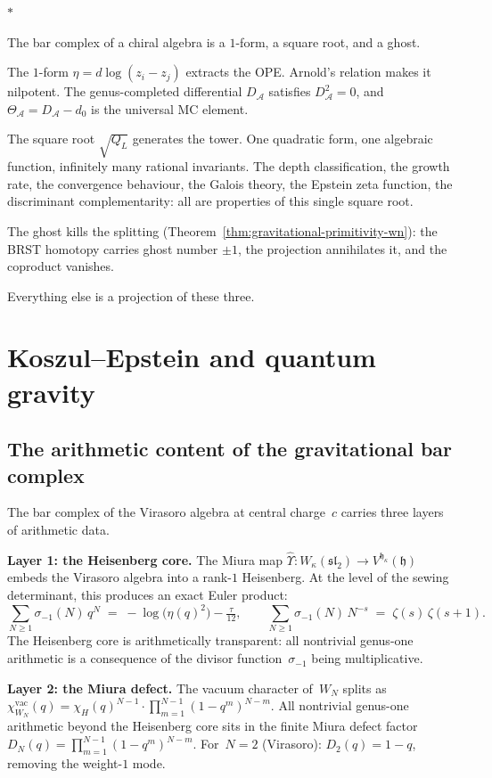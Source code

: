 \documentclass[11pt]{article}
\newcommand{\cA}{\mathcal{A}}
\newcommand{\sep}{\bigskip\begin{center}$*$\end{center}\medskip}
\begin{document}
\sep

The bar complex of a chiral algebra is a $1$-form, a square
root, and a ghost.

The $1$-form $\eta = d\log(z_i - z_j)$ extracts the OPE.
Arnold's relation makes it nilpotent.  The genus-completed
differential $D_\cA$ satisfies $D_\cA^2 = 0$, and
$\Theta_\cA = D_\cA - d_0$ is the universal MC element.

The square root $\sqrt{Q_L}$ generates the tower.  One
quadratic form, one algebraic function, infinitely many
rational invariants.  The depth classification, the growth
rate, the convergence behaviour, the Galois theory, the Epstein
zeta function, the discriminant complementarity: all
are properties of this single square root.

The ghost kills the splitting
(Theorem~\ref{thm:gravitational-primitivity-wn}): the BRST
homotopy carries ghost number $\pm 1$, the projection
annihilates it, and the coproduct vanishes.

Everything else is a projection of these three.


\section{Koszul--Epstein and quantum gravity}
\label{sec:koszul-epstein-gravity}

\subsection{The arithmetic content of the gravitational bar complex}

The bar complex of the Virasoro algebra at central charge~$c$
carries three layers of arithmetic data.

\textbf{Layer 1: the Heisenberg core.}
The Miura map $\hat\Upsilon\colon W_\kappa(\mathfrak{sl}_2) \to
V^{\mathfrak{h}_\kappa}(\mathfrak{h})$ embeds the Virasoro
algebra into a rank-$1$ Heisenberg.  At the level of the
sewing determinant, this produces an exact Euler product:
\[
\sum_{N \ge 1} \sigma_{-1}(N)\,q^N
\;=\; -\log\bigl(\eta(q)^2\bigr) - \tfrac{\tau}{12},
\qquad
\sum_{N \ge 1} \sigma_{-1}(N)\,N^{-s}
\;=\; \zeta(s)\,\zeta(s+1).
\]
The Heisenberg core is arithmetically transparent: all
nontrivial genus-one arithmetic is a consequence of the
divisor function~$\sigma_{-1}$ being multiplicative.

\textbf{Layer 2: the Miura defect.}
The vacuum character of~$W_N$ splits as
$\chi^{\mathrm{vac}}_{W_N}(q)
= \chi_H(q)^{N-1} \cdot
\prod_{m=1}^{N-1}(1-q^m)^{N-m}$.
All nontrivial genus-one arithmetic beyond the Heisenberg core
sits in the finite Miura defect factor
$D_N(q) = \prod_{m=1}^{N-1}(1-q^m)^{N-m}$.
For~$N = 2$ (Virasoro): $D_2(q) = 1 - q$, removing the weight-$1$
mode.
\end{document}
